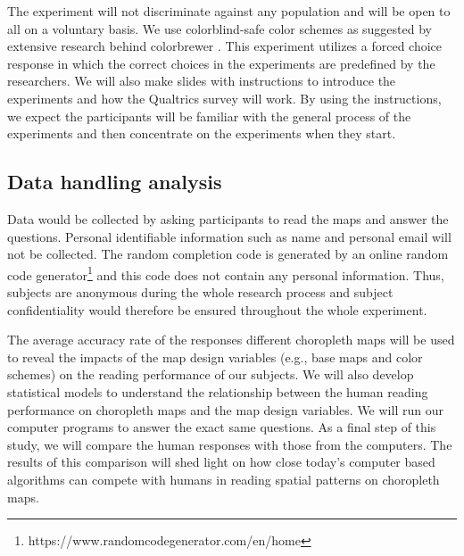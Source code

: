 The experiment will not discriminate against any population and will be open to all on a voluntary basis. We use colorblind-safe color schemes as suggested by extensive research behind colorbrewer \citep{harrower2003colorbrewer}. This experiment utilizes a forced choice response in which the correct choices in the experiments are predefined by the researchers. We will also make slides with instructions to introduce the experiments and how the Qualtrics survey will work. By using the instructions, we expect the participants will be familiar with the general process of the experiments and then concentrate on the experiments when they start. 

\subsection{Data handling analysis}
\label{sec:data-handline}

Data would be collected by asking participants to read the maps and answer the questions. Personal identifiable information such as name and personal email will not be collected. The random completion code is generated by an online random code generator\footnote{https://www.randomcodegenerator.com/en/home} and this code does not contain any personal information. Thus, subjects are anonymous during the whole research process and subject confidentiality would therefore be ensured throughout the whole experiment.

The average accuracy rate of the responses different choropleth maps will be used to reveal the impacts of the map design variables (e.g., base maps and color schemes) on the reading performance of our subjects. We will also develop statistical models to understand the relationship between the human reading performance on choropleth maps and the map design variables. We will run our computer programs to answer the exact same questions. As a final step of this study, we will compare the human responses with those from the computers. The results of this comparison will shed light on how close today's computer based algorithms can compete with humans in reading spatial patterns on choropleth maps. 






